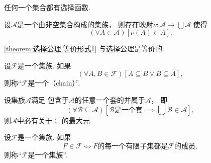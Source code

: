 \begin{axiom}
任何一个集合都有选择函数.
\end{axiom}

\begin{theorem}\label{theorem:选择公理.等价形式1}
设\(\mathscr{A}\)是一个由非空集合构成的集族，
则存在映射\(\nu\colon \mathscr{A} \to \bigcup \mathscr{A}\)
使得\begin{equation*}
	(\forall A \in \mathscr{A})
	[\nu(A) \in A].
\end{equation*}
\end{theorem}
\cref{theorem:选择公理.等价形式1} 与选择公理是等价的.%

\begin{definition}
设\(\mathscr{F}\)是一个集族.
如果\begin{equation*}
	(\forall A,B\in\mathscr{F})
	[A \subseteq B \lor B \subseteq A],
\end{equation*}
则称“\(\mathscr{F}\)是一个（chain）”.
\end{definition}

\begin{theorem}[佐恩引理]
设集族\(\mathscr{A}\)满足
包含于\(\mathscr{A}\)的任意一个套的并属于\(\mathscr{A}\)，
即\begin{equation*}
	(\forall \mathscr{B} \subseteq \mathscr{A})
	\left[ \text{$\mathscr{B}$是一个套} \implies \bigcup \mathscr{B} \in \mathscr{A} \right],
\end{equation*}
则\(\mathscr{A}\)中必有关于\(\subseteq\)的最大元.
\end{theorem}

\begin{definition}
设\(\mathscr{F}\)是一个集族.
如果\begin{equation*}
	F \in \mathscr{F}
	\iff
	\text{$F$的每一个有限子集都是$\mathscr{F}$的成员},
\end{equation*}
则称“\(\mathscr{F}\)是一个集族”.
\end{definition}

